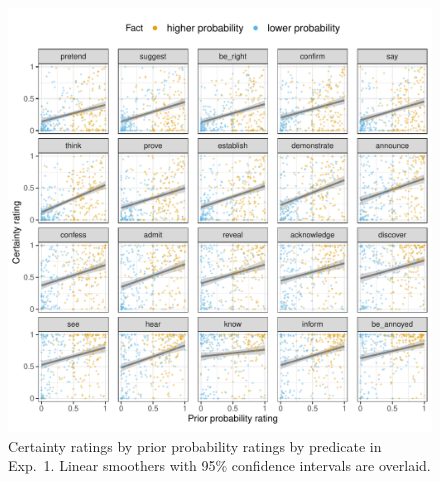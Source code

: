 \documentclass[11pt,fleqn]{article}
\newcommand{\6}{\mbox{$[\hspace*{-.6mm}[$}}
\newcommand{\9}{\mbox{$]\hspace*{-.6mm}]$}}
\begin{document}
\begin{figure}[h!]
\centering

\includegraphics[width=.7\paperwidth]{../../results/9-prior-projection/graphs/projection-by-prior}

\caption{Certainty ratings by prior probability ratings by predicate in Exp.~1. Linear smoothers with 95\% confidence intervals are overlaid.}
\label{f-projection}
\end{figure}
\end{document}
